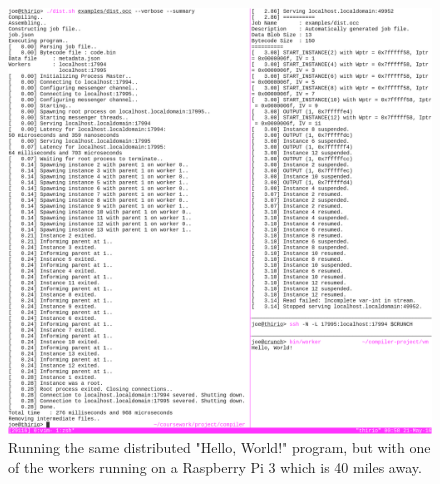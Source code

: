 \documentclass[12pt, twoside]{report}
\begin{document}
    \begin{figure}[H]
      \includegraphics[width=\textwidth]{images/distributed_pi}
      \caption{
        Running the same distributed "Hello, World!" program, but with one of
        the workers running on a Raspberry Pi 3 which is 40 miles away.
      }
    \end{figure}

  \clearpage
    
\end{document}
